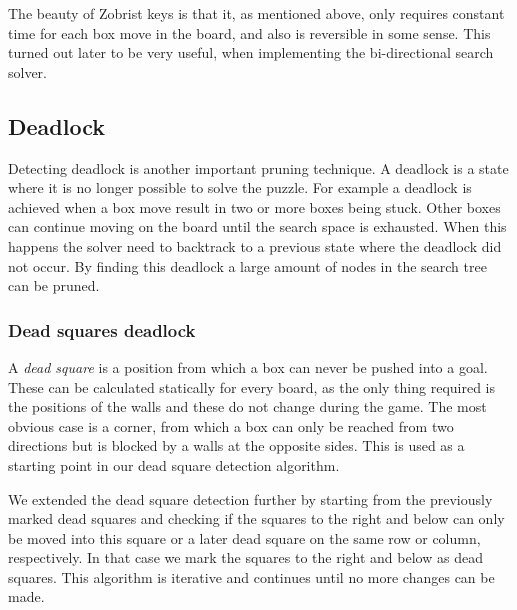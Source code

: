\documentclass[a4paper,11pt]{article}
\renewcommand{\*}[0]{\cdot}
\begin{document}

The beauty of Zobrist keys is that it, as mentioned above, only requires
constant time for each box move in the board, and also is reversible in some
sense. This turned out later to be very useful, when implementing the
bi-directional search solver.

\subsection{Deadlock}

Detecting deadlock is another important pruning technique. A deadlock is a
state where it is no longer possible to solve the puzzle. For example a deadlock
is achieved when a box move result in two or more boxes being stuck. Other boxes
can continue moving on the board until the search space is exhausted. When this
happens the solver need to backtrack to a previous state where the deadlock did
not occur. By finding this deadlock a large amount of nodes in the search tree
can be pruned.

\subsubsection{Dead squares deadlock}

A \emph{dead square} is a position from which a box can never be pushed into a
goal. These can be calculated statically for every board, as the only thing
required is the positions of the walls and these do not change during the game.
The most obvious case is a corner, from which a box can only be reached from two
directions but is blocked by a walls at the opposite sides. This is used as a
starting point in our dead square detection algorithm.

We extended the dead square detection further by starting from the previously
marked dead squares and checking if the squares to the right and below can only
be moved into this square or a later dead square on the same row or column,
respectively. In that case we mark the squares to the right and below as dead
squares. This algorithm is iterative and continues until no more changes can
be made.
\end{document}
